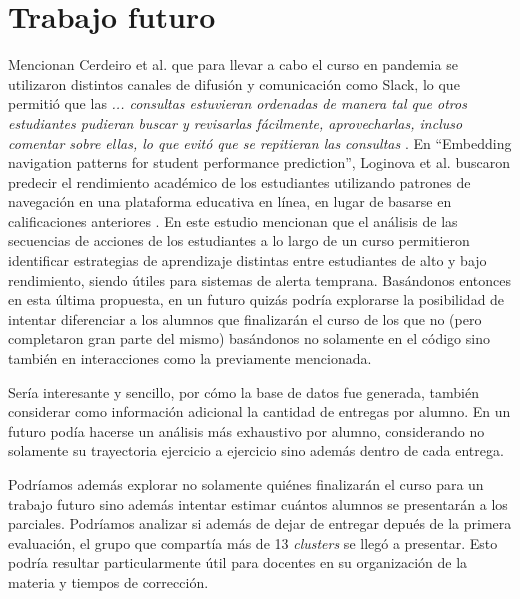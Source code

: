 \documentclass[11pt,a4paper,twoside,openany]{tesis}
\begin{document}
\chapter{Trabajo futuro}

Mencionan Cerdeiro et al. que para llevar a cabo el curso en pandemia se utilizaron distintos canales de difusión y comunicación como Slack, lo que permitió que las \emph{... consultas estuvieran ordenadas de manera tal que otros estudiantes pudieran buscar y revisarlas fácilmente, aprovecharlas, incluso comentar sobre ellas, lo que evitó que se repitieran las consultas} \cite{unsam2020}. En ``Embedding navigation patterns for student performance prediction'', Loginova et al. buscaron predecir el rendimiento académico de los estudiantes utilizando patrones de navegación en una plataforma educativa en línea, en lugar de basarse en calificaciones anteriores \cite{loginova2021embedding}. En este estudio mencionan que el análisis de las secuencias de acciones de los estudiantes a lo largo de un curso permitieron identificar estrategias de aprendizaje distintas entre estudiantes de alto y bajo rendimiento, siendo útiles para sistemas de alerta temprana. Basándonos entonces en esta última propuesta, en un futuro quizás podría explorarse la posibilidad de intentar diferenciar a los alumnos que finalizarán el curso de los que no (pero completaron gran parte del mismo) basándonos no solamente en el código sino también en interacciones como la previamente mencionada. 

Sería interesante y sencillo, por cómo la base de datos fue generada, también considerar como información adicional la cantidad de entregas por alumno. En un futuro podía hacerse un análisis más exhaustivo por alumno, considerando no solamente su trayectoria ejercicio a ejercicio sino además dentro de cada entrega. 

Podríamos además explorar no solamente quiénes finalizarán el curso para un trabajo futuro sino además intentar estimar cuántos alumnos se presentarán a los parciales. Podríamos analizar si además de dejar de entregar depués de la primera evaluación, el grupo que compartía más de 13 \emph{clusters} se llegó a presentar. Esto podría resultar particularmente útil para docentes en su organización de la materia y tiempos de corrección. 
\backmatter


\end{document}
